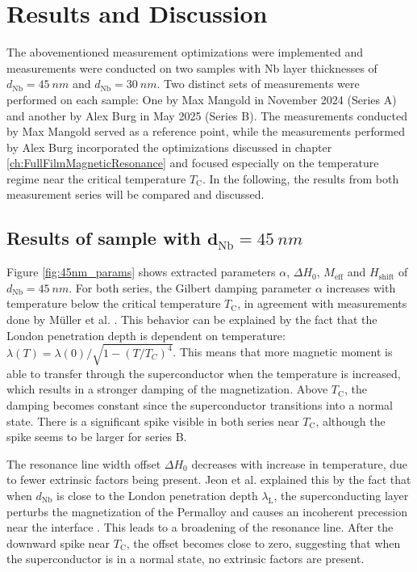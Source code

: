 \chapter{Results and Discussion}
\label{ch:results}
The abovementioned measurement optimizations were implemented and measurements were conducted on two samples with Nb layer thicknesses of $d_\textrm{Nb} = \SI{45}{nm}$ and $d_\textrm{Nb} = \SI{30}{nm}$. Two distinct sets of measurements were performed on each sample:
One by Max Mangold in November 2024 (Series A) and another by Alex Burg in May 2025 (Series B). The measurements conducted by Max Mangold served as a reference point, while the measurements performed by Alex Burg incorporated the optimizations discussed in chapter \ref{ch:FullFilmMagneticResonance} and focused especially on the temperature regime near the critical temperature $T_\textrm{C}$. In the following, the results from both measurement series will be compared and discussed.
\section{Results of sample with $\mathbf{d}_\textrm{Nb} = \SI{45}{nm}$}
Figure \ref{fig:45nm_params} shows extracted parameters $\alpha$, $\Delta H_0$, $M_\textrm{eff}$ and $H_{\text{shift}}$ of $d_\textrm{Nb} = \SI{45}{nm}$.
For both series, the Gilbert damping parameter $\alpha$ increases with temperature below the critical temperature $T_{\textrm{C}}$, in agreement with measurements done by Müller et al. \cite{muller2021temperature}. This behavior can be explained by the fact that the London penetration depth is dependent on temperature: $\lambda(T) = \lambda(0) / \sqrt{1 - (T/T_C)^4}$. This means that more magnetic moment is able to transfer through the superconductor when the temperature is increased, which results in a stronger damping of the magnetization. Above $T_{\textrm{C}}$, the damping becomes constant since the superconductor transitions into a normal state. There is a significant spike visible in both series near $T_\textrm{C}$, although the spike seems to be larger for series B.

The resonance line width offset $\Delta H_0$ decreases with increase in temperature, due to fewer extrinsic factors being present. Jeon et al. explained this by the fact that when $d_\textrm{Nb}$ is close to the London penetration depth $\lambda_\textrm{L}$, the superconducting layer perturbs the magnetization of the Permalloy and causes an incoherent precession near the interface \cite{Jeon2019}. This leads to a broadening of the resonance line. After the downward spike near $T_{\textrm{C}}$, the offset becomes close to zero, suggesting that when the superconductor is in a normal state, no extrinsic factors are present.

